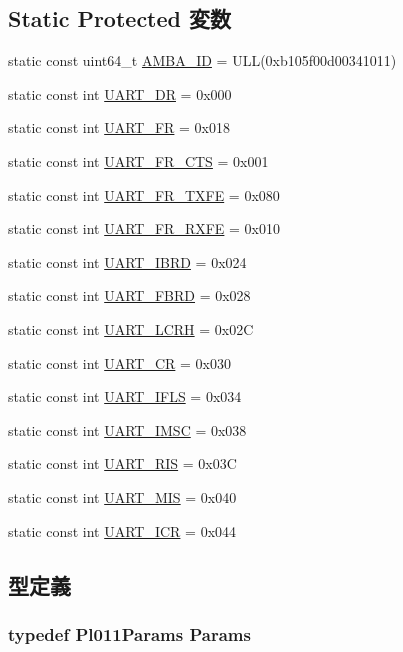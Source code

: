 \subsection*{Static Protected 変数}
\begin{DoxyCompactItemize}
\item 
static const uint64\_\-t \hyperlink{classPl011_ae438dff5177bb7a98567cd94061edab4}{AMBA\_\-ID} = ULL(0xb105f00d00341011)
\item 
static const int \hyperlink{classPl011_af74662958d5fcdb285fdf0d3b167eaaa}{UART\_\-DR} = 0x000
\item 
static const int \hyperlink{classPl011_afc10d1e9648d43b45f74ab80f2fe0fd9}{UART\_\-FR} = 0x018
\item 
static const int \hyperlink{classPl011_a38ebcfd24146cdf0bf0988abdf067605}{UART\_\-FR\_\-CTS} = 0x001
\item 
static const int \hyperlink{classPl011_a425fb28a4829a73986a5c01ea46190f7}{UART\_\-FR\_\-TXFE} = 0x080
\item 
static const int \hyperlink{classPl011_aeaf4ab07df0ff276fbf18e8a61c82ec4}{UART\_\-FR\_\-RXFE} = 0x010
\item 
static const int \hyperlink{classPl011_ace2f31c665cd2161671782939a9e2f1c}{UART\_\-IBRD} = 0x024
\item 
static const int \hyperlink{classPl011_a53ef29b47cbfbab3001682bb55198786}{UART\_\-FBRD} = 0x028
\item 
static const int \hyperlink{classPl011_aedd23dee902f909a96497e6a46cfe4d1}{UART\_\-LCRH} = 0x02C
\item 
static const int \hyperlink{classPl011_a6d01092295215e1cb41f34d2ed083816}{UART\_\-CR} = 0x030
\item 
static const int \hyperlink{classPl011_acc821871663cd6db6ee0b11dd16937a7}{UART\_\-IFLS} = 0x034
\item 
static const int \hyperlink{classPl011_ac02f58b5ec88452b14e2f0f89e0172ee}{UART\_\-IMSC} = 0x038
\item 
static const int \hyperlink{classPl011_a3ae85c77ab71dda8e8249f9081be71d8}{UART\_\-RIS} = 0x03C
\item 
static const int \hyperlink{classPl011_a41e42222af27e9de2191fd946e13e55a}{UART\_\-MIS} = 0x040
\item 
static const int \hyperlink{classPl011_ae4724cf215001c72eac36b98b5a09787}{UART\_\-ICR} = 0x044
\end{DoxyCompactItemize}


\subsection{型定義}
\hypertarget{classPl011_a7c50120eadc91b7f8522e0e4f1398769}{
\subsubsection[{Params}]{\setlength{\rightskip}{0pt plus 5cm}typedef Pl011Params {\bf Params}}}
\label{classPl011_a7c50120eadc91b7f8522e0e4f1398769}


